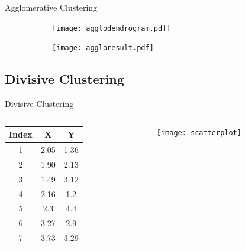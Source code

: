 \documentclass{beamer}
\begin{document}
	\begin{frame}{Agglomerative Clustering}
		\begin{figure}[htbp]
			\begin{subfigure}[b]{0.45\columnwidth}
				\centering
				\texttt{[image: agglodendrogram.pdf]}
			\end{subfigure}
			\hfill
			\begin{subfigure}[b]{0.45\columnwidth}
				\centering
				\texttt{[image: aggloresult.pdf]}
			\end{subfigure}
		\end{figure}
	\end{frame}
	
	\subsection{Divisive Clustering}
	\begin{frame}
		\tableofcontents
		[
		currentsection,
		currentsubsection,
		subsectionstyle=show/shaded/hide
		]
	\end{frame}
	
	\begin{frame}{Divisive Clustering}
		\begin{columns}
			\begin{column}{0.4\linewidth}
				\begin{table}[htbp]
					\centering
					\begin{tabular}{ccc}
						\toprule
						Index & X & Y\\
						\midrule
						1 & 2.05 & 1.36\\
						2 & 1.90 & 2.13\\
						3 & 1.49 & 3.12\\
						4 & 2.16 & 1.2\\
						5 & 2.3 & 4.4\\
						6 & 3.27 & 2.9\\
						7 & 3.73 & 3.29\\
						\bottomrule
					\end{tabular}
				\end{table}
			\end{column}
			\begin{column}{0.6\linewidth}
				\begin{figure}[htbp]
					\centering
					\texttt{[image: scatterplot]}
				\end{figure}
			\end{column}
		\end{columns}
	\end{frame}
\end{document}
